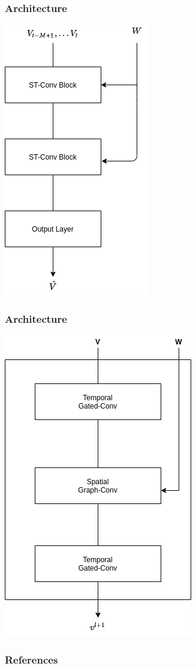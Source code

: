 \documentclass{beamer}
\begin{document}
\begin{frame}
  \frametitle{Architecture}
  \centering
  \includegraphics[height=\textheight]{img/blocks.png}
\end{frame}
\begin{frame}
  \frametitle{Architecture}
  \centering
  \includegraphics[height=\textheight]{img/inner-blocks.png}
\end{frame}
\begin{frame}[allowframebreaks]
  \frametitle{References}
  \printbibliography
\end{frame}
\end{document}
